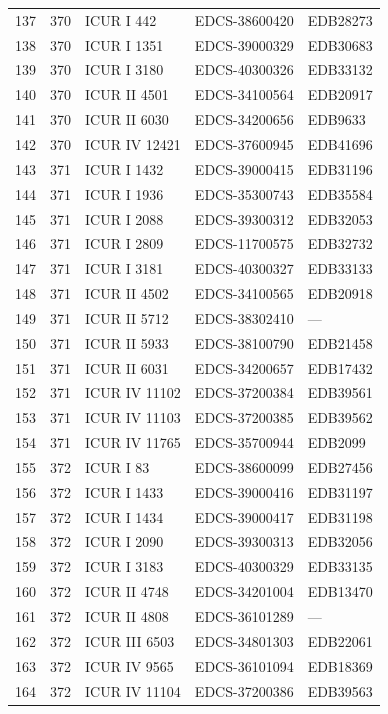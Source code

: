 \begin{longtable}{@{}r r l l l@{}}
137 & 370 & ICUR I 442 & EDCS-38600420 & EDB28273 \\
138 & 370 & ICUR I 1351 & EDCS-39000329 & EDB30683 \\
139 & 370 & ICUR I 3180 & EDCS-40300326 & EDB33132 \\
140 & 370 & ICUR II 4501 & EDCS-34100564 & EDB20917 \\
141 & 370 & ICUR II 6030 & EDCS-34200656 & EDB9633 \\
142 & 370 & ICUR IV 12421 & EDCS-37600945 & EDB41696 \\
143 & 371 & ICUR I 1432 & EDCS-39000415 & EDB31196 \\
144 & 371 & ICUR I 1936 & EDCS-35300743 & EDB35584 \\
145 & 371 & ICUR I 2088 & EDCS-39300312 & EDB32053 \\
146 & 371 & ICUR I 2809 & EDCS-11700575 & EDB32732 \\
147 & 371 & ICUR I 3181 & EDCS-40300327 & EDB33133 \\
148 & 371 & ICUR II 4502 & EDCS-34100565 & EDB20918 \\
149 & 371 & ICUR II 5712 & EDCS-38302410 & — \\
150 & 371 & ICUR II 5933 & EDCS-38100790 & EDB21458 \\
151 & 371 & ICUR II 6031 & EDCS-34200657 & EDB17432 \\
152 & 371 & ICUR IV 11102 & EDCS-37200384 & EDB39561 \\
153 & 371 & ICUR IV 11103 & EDCS-37200385 & EDB39562 \\
154 & 371 & ICUR IV 11765 & EDCS-35700944 & EDB2099 \\
155 & 372 & ICUR I 83 & EDCS-38600099 & EDB27456 \\
156 & 372 & ICUR I 1433 & EDCS-39000416 & EDB31197 \\
157 & 372 & ICUR I 1434 & EDCS-39000417 & EDB31198 \\
158 & 372 & ICUR I 2090 & EDCS-39300313 & EDB32056 \\
159 & 372 & ICUR I 3183 & EDCS-40300329 & EDB33135 \\
160 & 372 & ICUR II 4748 & EDCS-34201004 & EDB13470 \\
161 & 372 & ICUR II 4808 & EDCS-36101289 & — \\
162 & 372 & ICUR III 6503 & EDCS-34801303 & EDB22061 \\
163 & 372 & ICUR IV 9565 & EDCS-36101094 & EDB18369 \\
164 & 372 & ICUR IV 11104 & EDCS-37200386 & EDB39563 \\

\end{longtable}
